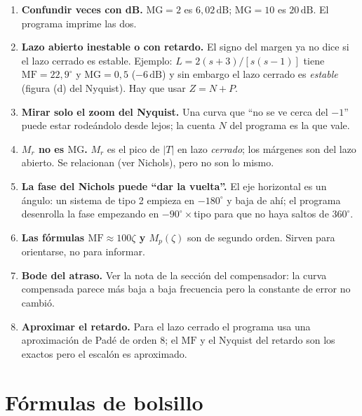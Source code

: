 \documentclass[11pt,a4paper]{article}
\newcommand{\dB}{\,\mathrm{dB}}
\newcommand{\MF}{\mathrm{MF}}
\newcommand{\MG}{\mathrm{MG}}
\newcommand{\Mr}{M_r}
\begin{document}
\begin{enumerate}
\item \textbf{Confundir veces con dB.} $\MG=2$ es $6{,}02\dB$; $\MG=10$ es $20\dB$. El programa imprime las dos.
\item \textbf{Lazo abierto inestable o con retardo.} El signo del margen ya no dice si el lazo cerrado es estable. Ejemplo:
 $L=2(s+3)/[s(s-1)]$ tiene $\MF=22{,}9^\circ$ y $\MG=0{,}5$ ($-6\dB$) y sin embargo el lazo cerrado es \emph{estable}
 (figura (d) del Nyquist). Hay que usar $Z=N+P$.
\item \textbf{Mirar solo el zoom del Nyquist.} Una curva que ``no se ve cerca del $-1$'' puede estar rodeándolo desde lejos;
 la cuenta $N$ del programa es la que vale.
\item \textbf{$\Mr$ no es $\MG$.} $\Mr$ es el pico de $|T|$ en lazo \emph{cerrado}; los márgenes son del lazo abierto.
 Se relacionan (ver Nichols), pero no son lo mismo.
\item \textbf{La fase del Nichols puede ``dar la vuelta''.} El eje horizontal es un ángulo: un sistema de tipo 2 empieza en
 $-180^\circ$ y baja de ahí; el programa desenrolla la fase empezando en $-90^\circ\times$tipo para que no haya saltos de $360^\circ$.
\item \textbf{Las fórmulas $\MF\approx100\zeta$ y $M_p(\zeta)$} son de segundo orden. Sirven para orientarse, no para
 informar.
\item \textbf{Bode del atraso.} Ver la nota de la sección del compensador: la curva compensada parece más baja a baja
 frecuencia pero la constante de error no cambió.
\item \textbf{Aproximar el retardo.} Para el lazo cerrado el programa usa una aproximación de Padé de orden 8; el $\MF$ y el
 Nyquist del retardo son los exactos pero el escalón es aproximado.
\end{enumerate}

\section{Fórmulas de bolsillo}
\end{document}
